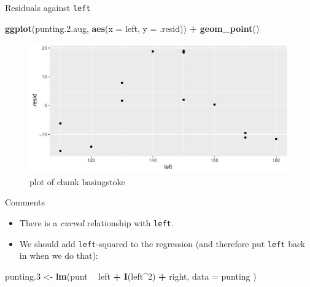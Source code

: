 \documentclass[ignorenonframetext,]{beamer}
\newenvironment{Shaded}{\begin{snugshade}}{\end{snugshade}}
\newcommand{\DataTypeTok}[1]{\textcolor[rgb]{0.13,0.29,0.53}{#1}}
\newcommand{\DecValTok}[1]{\textcolor[rgb]{0.00,0.00,0.81}{#1}}
\newcommand{\FloatTok}[1]{\textcolor[rgb]{0.00,0.00,0.81}{#1}}
\newcommand{\KeywordTok}[1]{\textcolor[rgb]{0.13,0.29,0.53}{\textbf{#1}}}
\newcommand{\NormalTok}[1]{#1}
\newcommand{\OperatorTok}[1]{\textcolor[rgb]{0.81,0.36,0.00}{\textbf{#1}}}
\newcommand{\StringTok}[1]{\textcolor[rgb]{0.31,0.60,0.02}{#1}}
\begin{document}
\begin{frame}[fragile]{Residuals against \texttt{left}}
\protect\hypertarget{residuals-against-left}{}

\begin{Shaded}
\begin{Highlighting}[]
\KeywordTok{ggplot}\NormalTok{(punting.}\FloatTok{2.}\NormalTok{aug, }\KeywordTok{aes}\NormalTok{(}\DataTypeTok{x =}\NormalTok{ left, }\DataTypeTok{y =}\NormalTok{ .resid)) }\OperatorTok{+}
\StringTok{  }\KeywordTok{geom_point}\NormalTok{()}
\end{Highlighting}
\end{Shaded}

\begin{figure}
\centering
\includegraphics{figure/basingstoke-1.pdf}
\caption{plot of chunk basingstoke}
\end{figure}

\end{frame}

\begin{frame}[fragile]{Comments}
\protect\hypertarget{comments-8}{}

\begin{itemize}
\item
  There is a \emph{curved} relationship with \texttt{left}.
\item
  We should add \texttt{left}-squared to the regression (and therefore
  put \texttt{left} back in when we do that):
\end{itemize}

\begin{Shaded}
\begin{Highlighting}[]
\NormalTok{punting}\FloatTok{.3}\NormalTok{ <-}\StringTok{ }\KeywordTok{lm}\NormalTok{(punt }\OperatorTok{~}\StringTok{ }\NormalTok{left }\OperatorTok{+}\StringTok{ }\KeywordTok{I}\NormalTok{(left}\OperatorTok{^}\DecValTok{2}\NormalTok{) }\OperatorTok{+}\StringTok{ }\NormalTok{right,}
  \DataTypeTok{data =}\NormalTok{ punting}
\NormalTok{)}
\end{Highlighting}
\end{Shaded}

\end{frame}
\end{document}
